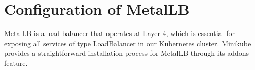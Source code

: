 










\section{Configuration of MetalLB}
MetalLB is a load balancer that operates at Layer 4, which is essential for exposing all services of type LoadBalancer in our Kubernetes cluster. Minikube provides a straightforward installation process for MetalLB through its addons feature.

